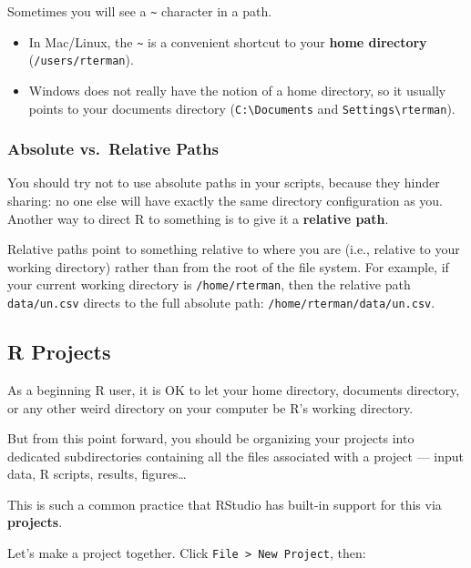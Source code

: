 \documentclass[
]{book}
\providecommand{\tightlist}{%
  \setlength{\itemsep}{0pt}\setlength{\parskip}{0pt}}
\begin{document}
Sometimes you will see a \texttt{\textasciitilde{}} character in a path.

\begin{itemize}
\tightlist
\item
  In Mac/Linux, the \texttt{\textasciitilde{}} is a convenient shortcut to your \textbf{home directory} (\texttt{/users/rterman}).
\item
  Windows does not really have the notion of a home directory, so it usually points to your documents directory (\texttt{C:\textbackslash{}Documents} and \texttt{Settings\textbackslash{}rterman}).
\end{itemize}

\hypertarget{absolute-vs.-relative-paths}{%
\subsubsection*{Absolute vs.~Relative Paths}\label{absolute-vs.-relative-paths}}

You should try not to use absolute paths in your scripts, because they hinder sharing: no one else will have exactly the same directory configuration as you. Another way to direct R to something is to give it a \textbf{relative path}.

Relative paths point to something relative to where you are (i.e., relative to your working directory) rather than from the root of the file system. For example, if your current working directory is \texttt{/home/rterman}, then the relative path \texttt{data/un.csv} directs to the full absolute path: \texttt{/home/rterman/data/un.csv}.

\hypertarget{r-projects}{%
\subsection{R Projects}\label{r-projects}}

As a beginning R user, it is OK to let your home directory, documents directory, or any other weird directory on your computer be R's working directory.

But from this point forward, you should be organizing your projects into dedicated subdirectories containing all the files associated with a project --- input data, R scripts, results, figures\ldots{}

This is such a common practice that RStudio has built-in support for this via \textbf{projects}.

Let's make a project together. Click \texttt{File\ \textgreater{}\ New\ Project}, then:
\end{document}
